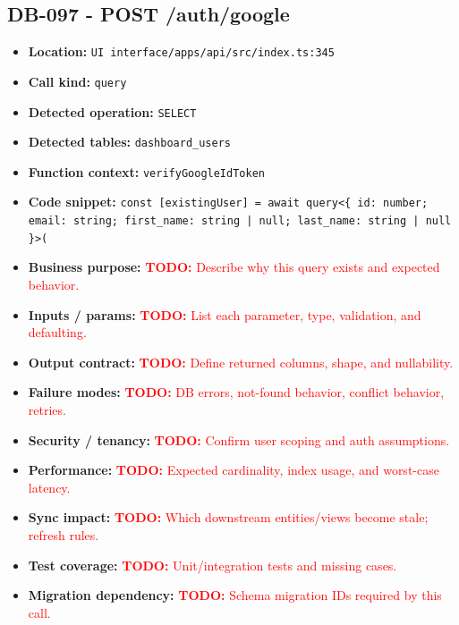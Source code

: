 \documentclass[11pt]{article}
\newcommand{\todoitem}[1]{\textcolor{red}{\textbf{TODO:} #1}}
\begin{document}
\subsection{DB-097 - POST /auth/google}
\begin{itemize}[leftmargin=1.5em]
\item \textbf{Location:} \texttt{UI interface/apps/api/src/index.ts:345}
\item \textbf{Call kind:} \texttt{query}
\item \textbf{Detected operation:} \texttt{SELECT}
\item \textbf{Detected tables:} \texttt{dashboard\_users}
\item \textbf{Function context:} \texttt{verifyGoogleIdToken}
\item \textbf{Code snippet:} \texttt{const [existingUser] = await query<\{ id: number; email: string; first\_name: string | null; last\_name: string | null \}>(}
\item \textbf{Business purpose:} \todoitem{Describe why this query exists and expected behavior.}
\item \textbf{Inputs / params:} \todoitem{List each parameter, type, validation, and defaulting.}
\item \textbf{Output contract:} \todoitem{Define returned columns, shape, and nullability.}
\item \textbf{Failure modes:} \todoitem{DB errors, not-found behavior, conflict behavior, retries.}
\item \textbf{Security / tenancy:} \todoitem{Confirm user scoping and auth assumptions.}
\item \textbf{Performance:} \todoitem{Expected cardinality, index usage, and worst-case latency.}
\item \textbf{Sync impact:} \todoitem{Which downstream entities/views become stale; refresh rules.}
\item \textbf{Test coverage:} \todoitem{Unit/integration tests and missing cases.}
\item \textbf{Migration dependency:} \todoitem{Schema migration IDs required by this call.}
\end{itemize}
\end{document}
